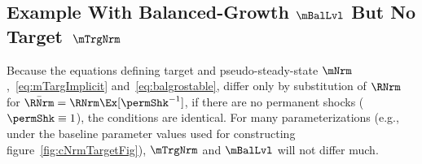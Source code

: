 \documentclass[BufferStockTheory]{subfiles}
\begin{document}
\begin{comment}
The proofs of these theorems are intuitive, and almost completely parallel; to save space, they are relegated to Appendix~\ref{sec:ApndxMTargetIsStable}.  They involve three steps:
\begin{enumerate}
\item Existence and continuity of $\Ex_{t}[\mNrm_{t+1}/\mNrm_{t}]$ (theorem~\ref{thm:target}) or $\Ex_{t}[\mNrm_{t+1}\permShk_{t+1}/\mNrm_{t}]$ (theorem~\ref{thm:MSSBalExists})
  \begin{itemize}
  \item This follows from existence and continuity of the constituents
  \end{itemize}
\item Existence of the equilibrium point
  \begin{itemize}
  \item This follows from existence of upper and lower bound limiting MPCs, existence and continuity of the decision rule, and the Intermediate Value Theorem
  \end{itemize}
\item Monotonicity of $\Ex_{t}[{\mNrm}_{t+1}-\mNrm_{t}]$ or $\Ex_{t}[{\mNrm}_{t+1}\permShk_{t+1}-\mNrm_{t}]$
  \begin{itemize}
  \item This follows from concavity of the consumption function
  \end{itemize}
\end{enumerate}

\end{comment}

\subsection{Example With Balanced-Growth \texorpdfstring{$\mBalLvl$}{m} But No Target~\texorpdfstring{$\mTrgNrm$}{m}}

Because the equations defining target and pseudo-steady-state $\mNrm$,~\eqref{eq:mTargImplicit} and~\eqref{eq:balgrostable}, differ only by substitution of $\RNrm$ for $\bar{\RNrm}=\RNrm \Ex[\permShk^{-1}]$, if there are no permanent shocks ($\permShk \equiv 1$), the conditions are identical.  For many parameterizations (e.g., under the baseline parameter values used for constructing figure~\ref{fig:cNrmTargetFig}), $\mTrgNrm$ and $\mBalLvl$ will not differ much.

\renewcommand{\figFile}{GICModFailsButGICRawHolds}
\hypertarget{\figFile}{}

\end{document}
